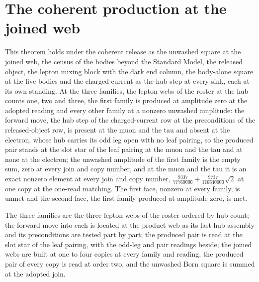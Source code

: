 \section{The coherent production at the joined web}\label{mod:I-5-D540119-cpri-t1}
\begin{chconditional}\label{box:I-5-D540119-cpri-t1:1}
This theorem holds under the coherent release as the unwashed square at the joined web, the census of the bodies beyond the Standard Model, the released object, the lepton mixing block with the dark end column, the body-alone square at the five bodies and the charged current as the hub step at every sink, each at its own standing. At the three families, the lepton webs of the roster at the hub counts one, two and three, the first family is produced at amplitude zero at the adopted reading and every other family at a nonzero unwashed amplitude: the forward move, the hub step of the charged-current row at the preconditions of the released-object row, is present at the muon and the tau and absent at the electron, whose hub carries its odd leg open with no leaf pairing, so the produced pair stands at the slot star of the leaf pairing at the muon and the tau and at none at the electron; the unwashed amplitude of the first family is the empty sum, zero at every join and copy number, and at the muon and the tau it is an exact nonzero element at every join and copy number, $\tfrac{9337}{77760000} + \tfrac{9737}{116640000}\sqrt{2}$ at one copy at the one-read matching. The first face, nonzero at every family, is unmet and the second face, the first family produced at amplitude zero, is met.
\end{chconditional}
The three families are the three lepton webs of the roster ordered by hub count; the forward move into each is located at the product web as its last hub assembly and its preconditions are tested part by part; the produced pair is read at the slot star of the leaf pairing, with the odd-leg and pair readings beside; the joined webs are built at one to four copies at every family and reading, the produced pair of every copy is read at order two, and the unwashed Born square is summed at the adopted join.

